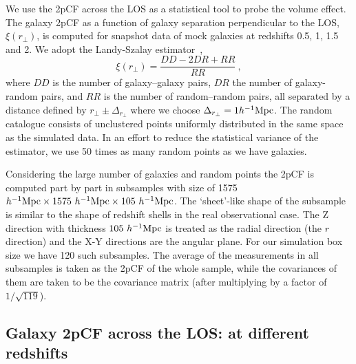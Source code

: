 \documentclass[iop]{emulateapj}
\begin{document}

We use the 2pCF across the LOS as a statistical tool to probe the volume effect.
The galaxy 2pCF as a function of galaxy separation perpendicular to the LOS, $\xi(r_\perp)$, is computed for snapshot data of mock galaxies at redshifts 0.5, 1, 1.5 and 2.
We adopt the Landy-Szalay estimator~\citep{1993ApJ...412...64L},
\begin{equation}
\xi(r_\perp)=\frac{DD-2DR+RR}{RR}\ ,
\end{equation}
where $DD$ is the number of galaxy--galaxy pairs, 
$DR$ the number of galaxy-random pairs, 
and $RR$ is the number of random--random pairs, 
all separated by a distance defined by $r_\perp\pm\Delta_{r_\perp}$ where we choose $\Delta_{r_\perp}=1h^{-1}\rm Mpc$.
The random catalogue consists of unclustered points uniformly distributed in the same space as the simulated data. 
In an effort to reduce the statistical variance of the estimator, we use 50 times as many random points as we have galaxies.

Considering the large number of galaxies and random points the 2pCF is computed part by part in subsamples with 
size of 1575 $h^{-1}{\rm Mpc}\times 1575\ h^{-1}{\rm Mpc}\times 105\ h^{-1}{\rm Mpc}$.
The `sheet'-like shape of the subsample is similar to the shape of redshift shells in the real observational case.
The Z direction with thickness $105\ h^{-1}\rm Mpc$ is treated as the radial direction (the $r$ direction) 
and the X-Y directions %
are the angular plane.
For our simulation box size we have 120 such subsamples.
The average of the measurements in all subsamples is taken as the 2pCF of the whole sample,
while the covariances of them are taken to be the covariance matrix (after multiplying by a factor of $1/\sqrt{119}$).


\subsection{Galaxy 2pCF across the LOS: at different redshifts}\label{sec_2pCF_diffz}
\end{document}
